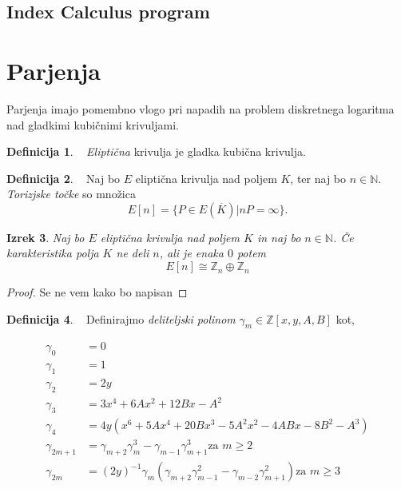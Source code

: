 \documentclass[12pt,a4paper,twoside]{article}
\theoremstyle{definition} %
\newtheorem{definicija}{Definicija}[section]
\theoremstyle{plain} %
\newtheorem{izrek}[definicija]{Izrek}
\numberwithin{equation}{section}  %
\newcommand{\N}{\mathbb N}
\newcommand{\Z}{\mathbb Z}
\newcommand{\E}[1]{E({#1})}
\begin{document}
\subsection{Index Calculus program}


\section{Parjenja}

Parjenja imajo pomembno vlogo pri napadih na problem diskretnega logaritma nad gladkimi kubičnimi krivuljami.

\begin{definicija}~
\emph{Eliptična} krivulja je gladka kubična krivulja.
\end{definicija}

\begin{definicija}~
Naj bo $E$ eliptična krivulja nad poljem $K$, ter naj bo $n\in \N$. \emph{Torizjske točke} so množica
$$E[n] = \{ P \in \E{\overline{K}} | nP = \infty \}.$$
\end{definicija}

\begin{izrek}
\label{IzrekTor}
Naj bo $E$ eliptična krivulja nad poljem $K$ in naj bo $n \in \N$. Če karakteristika polja $K$ ne deli $n$, ali je enaka $0$ potem
$$E[n] \cong \mathbb{Z}_n \oplus \mathbb{Z}_n$$

\end{izrek}

\begin{proof}
Se ne vem kako bo napisan
\end{proof}

\begin{definicija}~
Definirajmo \emph{deliteljski polinom} $\gamma_m \in \Z[x,y,A,B]$ kot,


\begin{align}
\gamma_0 &{}= 0  \nonumber \\
\gamma_1 &{}= 1  \nonumber \\
\gamma_2 &{}= 2y  \nonumber \\
\gamma_3 &{}= 3x^4 + 6Ax^2 + 12Bx-A^2 \nonumber \\
\gamma_4 &{}= 4y(x^6+5Ax^4+20Bx^3-5A^2x^2-4ABx-8B^2-A^3) \nonumber \\
\gamma_{2m+1} &{}= \gamma_{m+2}\gamma_{m}^3-\gamma_{m-1}\gamma_{m+1}^3 \text{za } m \geq 2 \nonumber \\
\gamma_{2m} &{}= (2y)^{-1}\gamma_{m}(\gamma_{m+2}\gamma_{m-1}^2-\gamma_{m-2}\gamma_{m+1}^2)\text{za } m \geq 3 \nonumber
\end{align}

\end{definicija}
\end{document}
